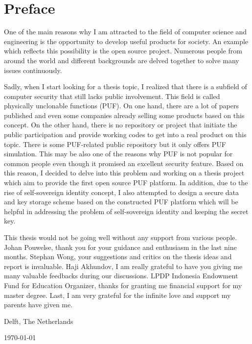 \chapter*{Preface}
One of the main reasons why I am attracted to the field of computer science and engineering is the opportunity to develop useful products for society. An example which reflects this possibility is the open source project. Numerous people from around the world and different backgrounds are delved together to solve many issues continuously.

Sadly, when I start looking for a thesis topic, I realized that there is a subfield of computer security that still lacks public involvement. This field is called physically unclonable functions (PUF). On one hand, there are a lot of papers published and even some companies already selling some products based on this concept. On the other hand, there is no repository or project that initiate the public participation and provide working codes to get into a real product on this topic. There is some PUF-related public repository but it only offers PUF simulation. This may be also one of the reasons why PUF is not popular for common people even though it promised an excellent security feature. Based on this reason, I decided to delve into this problem and working on a thesis project which aim to provide the first open source PUF platform. In addition, due to the rise of self-sovereign identity concept, I also attempted to design a secure data and key storage scheme based on the constructed PUF platform which will be helpful in addressing the problem of self-sovereign identity and keeping the secret key.
\vspace{1\baselineskip}

\noindent
This thesis would not be going well without any support from various people. Johan Pouwelse, thank you for your guidance and enthusiasm in the last nine months.  Stephan Wong, your suggestions and critics on the thesis ideas and report is invaluable. Haji Akhundov, I am really grateful to have you giving me many valuable feedbacks during our discussions.
LPDP Indonesia Endowment Fund for Education Organizer, thanks for granting me financial support for my master degree. Last, I am very grateful for the infinite love and support my parents have given me.

\vspace{1\baselineskip}

\noindent
\reportAuthor

\vspace{1\baselineskip}

\noindent
Delft, The Netherlands

\noindent
\today
